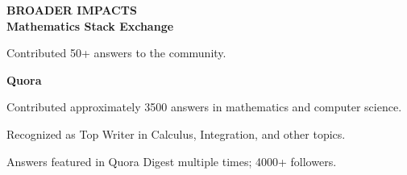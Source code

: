 \documentclass[a4paper, 12pt]{article}
\begin{document}
\begin{flushleft}
\faTasks\quad\textbf{BROADER IMPACTS}\\[4pt]
\textbf{Mathematics Stack Exchange}
\begin{compactitem}
    \item Contributed 50+ answers to the community.
\end{compactitem}
\textbf{Quora}
\begin{compactitem}
    \item Contributed approximately 3500 answers in mathematics and computer science.
    \item Recognized as Top Writer in Calculus, Integration, and other topics.
    \item Answers featured in Quora Digest multiple times; 4000+ followers.
\end{compactitem}
\end{flushleft}
\end{document}
